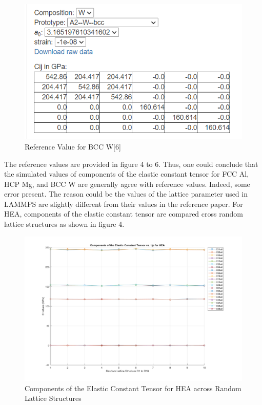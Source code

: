 \documentclass[a4paper,11pt]{article} %
\begin{document}
\begin{figure}[ht]
   \centering
   \includegraphics[width=1.1\textwidth]{W_ref.PNG}
   \caption{Reference Value for BCC W[6]}
\end{figure}
The reference values are provided in figure 4 to 6.
Thus, one could conclude that the simulated values of components of the elastic constant tensor for FCC Al, HCP Mg, and BCC W are generally agree with reference values.
Indeed, some error present. The reason could be the values of the lattice parameter used in LAMMPS are slightly different from their values in the reference paper.
\clearpage
For HEA, components of the elastic constant tensor are compared cross random lattice structures as shown in figure 4.
\begin{figure}[ht]
    \centering
    \includegraphics[width=1.1\textwidth]{HEA.png}
    \caption{Components of the Elastic Constant Tensor for HEA across Random Lattice Structures}
\end{figure} 
\end{document}
